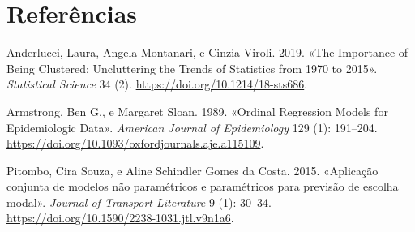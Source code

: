 \documentclass[
  a4paperpaper,
  DIV=11,
  numbers=noendperiod]{scrartcl}
\newlength{\cslhangindent}
\newenvironment{CSLReferences}[2] %
 {\begin{list}{}{%
  \setlength{\itemindent}{0pt}
  \setlength{\leftmargin}{0pt}
  \setlength{\parsep}{0pt}
  \ifodd #1
   \setlength{\leftmargin}{\cslhangindent}
   \setlength{\itemindent}{-1\cslhangindent}
  \fi
  \setlength{\itemsep}{#2\baselineskip}}}
 {\end{list}}
\begin{document}
\newpage{}

\section{Referências}\label{referuxeancias}

\label{refs}
\begin{CSLReferences}{1}{0}
Anderlucci, Laura, Angela Montanari, e Cinzia Viroli. 2019. {«The
Importance of Being Clustered: Uncluttering the Trends of Statistics
from 1970 to 2015»}. \emph{Statistical Science} 34 (2).
\url{https://doi.org/10.1214/18-sts686}.

Armstrong, Ben G., e Margaret Sloan. 1989. {«Ordinal Regression Models
for Epidemiologic Data»}. \emph{American Journal of Epidemiology} 129
(1): 191--204. \url{https://doi.org/10.1093/oxfordjournals.aje.a115109}.

Pitombo, Cira Souza, e Aline Schindler Gomes da Costa. 2015. {«Aplicação
conjunta de modelos não paramétricos e paramétricos para previsão de
escolha modal»}. \emph{Journal of Transport Literature} 9 (1): 30--34.
\url{https://doi.org/10.1590/2238-1031.jtl.v9n1a6}.

\end{CSLReferences}
\end{document}
